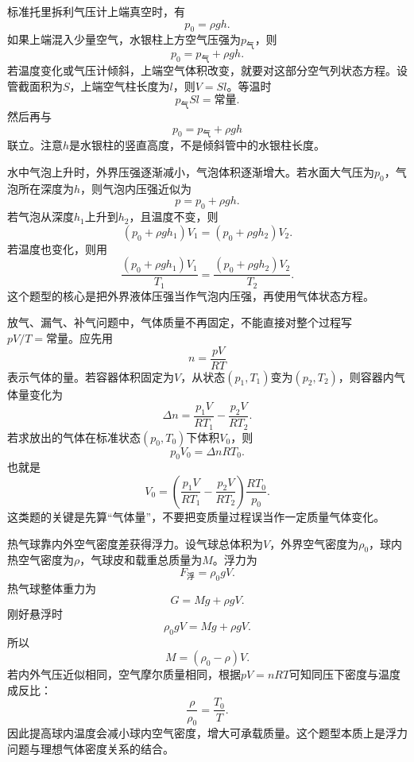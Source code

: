 \begin{casetypebox}[title={\strut\textcolor{white}{\bfseries 常见题型：水银气压计混入空气}}]
标准托里拆利气压计上端真空时，有
\[
  p_0=\rho gh.
\]
如果上端混入少量空气，水银柱上方空气压强为$p_{\text{气}}$，则
\[
  p_0=p_{\text{气}}+\rho gh.
\]
若温度变化或气压计倾斜，上端空气体积改变，就要对这部分空气列状态方程。设管截面积为$S$，上端空气柱长度为$l$，则$V=Sl$。等温时
\[
  p_{\text{气}}Sl=\text{常量}.
\]
然后再与
\[
  p_0=p_{\text{气}}+\rho gh
\]
联立。注意$h$是水银柱的竖直高度，不是倾斜管中的水银柱长度。
\end{casetypebox}

\begin{casetypebox}[title={\strut\textcolor{white}{\bfseries 常见题型：气泡上升问题}}]
水中气泡上升时，外界压强逐渐减小，气泡体积逐渐增大。若水面大气压为$p_0$，气泡所在深度为$h$，则气泡内压强近似为
\[
  p=p_0+\rho gh.
\]
若气泡从深度$h_1$上升到$h_2$，且温度不变，则
\[
  (p_0+\rho gh_1)V_1=(p_0+\rho gh_2)V_2.
\]
若温度也变化，则用
\[
  \frac{(p_0+\rho gh_1)V_1}{T_1}
  =
  \frac{(p_0+\rho gh_2)V_2}{T_2}.
\]
这个题型的核心是把外界液体压强当作气泡内压强，再使用气体状态方程。
\end{casetypebox}

\begin{casetypebox}[title={\strut\textcolor{white}{\bfseries 常见题型：变质量气体问题}}]
放气、漏气、补气问题中，气体质量不再固定，不能直接对整个过程写$pV/T=\text{常量}$。应先用
\[
  n=\frac{pV}{RT}
\]
表示气体的量。若容器体积固定为$V$，从状态$(p_1,T_1)$变为$(p_2,T_2)$，则容器内气体量变化为
\[
  \Delta n=\frac{p_1V}{RT_1}-\frac{p_2V}{RT_2}.
\]
若求放出的气体在标准状态$(p_0,T_0)$下体积$V_0$，则
\[
  p_0V_0=\Delta nRT_0.
\]
也就是
\[
  V_0=\left(\frac{p_1V}{RT_1}-\frac{p_2V}{RT_2}\right)\frac{RT_0}{p_0}.
\]
这类题的关键是先算“气体量”，不要把变质量过程误当作一定质量气体变化。
\end{casetypebox}

\begin{casetypebox}[title={\strut\textcolor{white}{\bfseries 常见题型：热气球问题}}]
热气球靠内外空气密度差获得浮力。设气球总体积为$V$，外界空气密度为$\rho_0$，球内热空气密度为$\rho$，气球皮和载重总质量为$M$。浮力为
\[
  F_{\text{浮}}=\rho_0 gV.
\]
热气球整体重力为
\[
  G=Mg+\rho gV.
\]
刚好悬浮时
\[
  \rho_0 gV=Mg+\rho gV.
\]
所以
\[
  M=(\rho_0-\rho)V.
\]
若内外气压近似相同，空气摩尔质量相同，根据$pV=nRT$可知同压下密度与温度成反比：
\[
  \frac{\rho}{\rho_0}=\frac{T_0}{T}.
\]
因此提高球内温度会减小球内空气密度，增大可承载质量。这个题型本质上是浮力问题与理想气体密度关系的结合。
\end{casetypebox}


